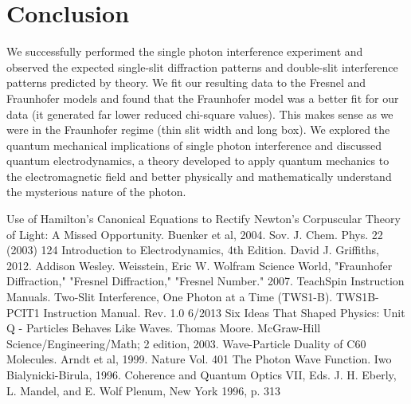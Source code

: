 \documentclass[prb,preprint]{revtex4-1}
\begin{document}
\section{Conclusion}

We successfully performed the single photon interference experiment and observed the expected single-slit diffraction patterns and double-slit interference patterns predicted by theory.  We fit our resulting data to the Fresnel and Fraunhofer models and found that the Fraunhofer model was a better fit for our data (it generated far lower reduced chi-square values).  This makes sense as we were in the Fraunhofer regime (thin slit width and long box).  We explored the quantum mechanical implications of single photon interference and discussed quantum electrodynamics, a theory developed to apply quantum mechanics to the electromagnetic field and better physically and mathematically understand the mysterious nature of the photon.

\begin{thebibliography}{3}
 Use of Hamilton's Canonical Equations to Rectify Newton's Corpuscular Theory of Light:  A Missed Opportunity.  Buenker et al, 2004.  Sov. J. Chem. Phys. 22 (2003) 124
 Introduction to Electrodynamics, 4th Edition.  David J. Griffiths, 2012.  Addison Wesley.
Weisstein, Eric W. Wolfram Science World, "Fraunhofer Diffraction," "Fresnel Diffraction," "Fresnel Number." 2007. 
 TeachSpin Instruction Manuals.  Two-Slit Interference, One Photon at a Time (TWS1-B).  TWS1B-PCIT1 Instruction Manual. Rev. 1.0 6/2013
 Six Ideas That Shaped Physics: Unit Q - Particles Behaves Like Waves.  Thomas Moore.  McGraw-Hill Science/Engineering/Math; 2 edition, 2003.
 Wave-Particle Duality of C60 Molecules.  Arndt et al, 1999.  Nature Vol. 401
The Photon Wave Function.  Iwo Bialynicki-Birula, 1996.  Coherence and Quantum Optics VII, Eds. J. H. Eberly, L. Mandel, and E. Wolf
Plenum, New York 1996, p. 313
\end{thebibliography}
\end{document}
